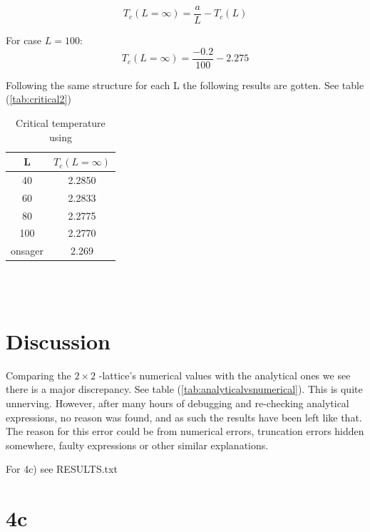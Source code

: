 \documentclass{article}
\begin{document}
  $$T_c(L=\infty)=\frac{a}{L}-T_c(L)$$

  For case $L=100$:
  $$T_c(L=\infty)=\frac{-0.2}{100}-2.275$$

  Following the same structure for each L the following results are gotten. See table (\ref{tab:critical2})


    \begin{table}[ht]
      \centering
      \caption{Critical temperature using \cite{onsager}}
      \vspace{2mm}
      \label{tab:critical}
      \begin{tabular}{|c|c|}
          \hline
           L & $T_c(L=\infty)$\\
          \hline \hline
          40  & 2.2850 \\
          60  & 2.2833 \\
          80  & 2.2775 \\
          100 & 2.2770 \\
          onsager & 2.269 \\
          \hline
      \end{tabular} \\
      \hspace{0pt}\\
    \end{table}

\vspace{1cm}

\clearpage
\newpage

\section{Discussion} \label{sec:Discussion}

Comparing the \texorpdfstring{ $2 \times 2$ }{text}-lattice's numerical values with the analytical ones we see there is a major discrepancy. See table (\ref{tab:analyticalvsnumerical}). This is quite unnerving. However, after many hours of debugging and re-checking analytical expressions, no reason was found, and as such the results have been left like that. The reason for this error could be from numerical errors, truncation errors hidden somewhere, faulty expressions or other similar explanations.

For 4c) see RESULTS.txt



\section{4c}
\end{document}

